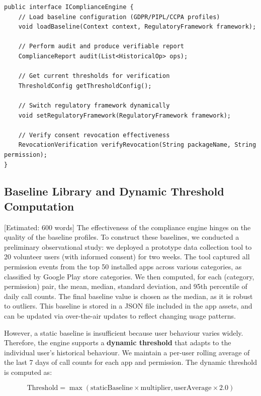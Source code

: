 \begin{lstlisting}[caption=IComplianceEngine core interface with regulatory audit support]
public interface IComplianceEngine {
    // Load baseline configuration (GDPR/PIPL/CCPA profiles)
    void loadBaseline(Context context, RegulatoryFramework framework);
    
    // Perform audit and produce verifiable report
    ComplianceReport audit(List<HistoricalOp> ops);
    
    // Get current thresholds for verification
    ThresholdConfig getThresholdConfig();
    
    // Switch regulatory framework dynamically
    void setRegulatoryFramework(RegulatoryFramework framework);
    
    // Verify consent revocation effectiveness
    RevocationVerification verifyRevocation(String packageName, String permission);
}
\end{lstlisting}

\subsection{Baseline Library and Dynamic Threshold Computation} [Estimated: 600 words]
The effectiveness of the compliance engine hinges on the quality of the baseline profiles. To construct these baselines, we conducted a preliminary observational study: we deployed a prototype data collection tool to 20 volunteer users (with informed consent) for two weeks. The tool captured all permission events from the top 50 installed apps across various categories, as classified by Google Play store categories. We then computed, for each (category, permission) pair, the mean, median, standard deviation, and 95th percentile of daily call counts. The final baseline value is chosen as the median, as it is robust to outliers. This baseline is stored in a JSON file included in the app assets, and can be updated via over-the-air updates to reflect changing usage patterns.

However, a static baseline is insufficient because user behaviour varies widely. Therefore, the engine supports a \textbf{dynamic threshold} that adapts to the individual user's historical behaviour. We maintain a per-user rolling average of the last 7 days of call counts for each app and permission. The dynamic threshold is computed as:

\[
\text{Threshold} = \max( \text{staticBaseline} \times \text{multiplier}, \text{userAverage} \times 2.0 )
\]

